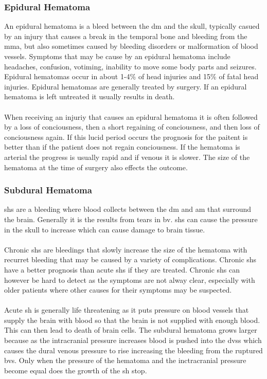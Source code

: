 \documentclass[11pt]{article}
\begin{document}
\subsubsection{Epidural Hematoma}
An epidural hematoma is a bleed between the \gls{dm} and the skull, typically casued by an injury that causes a break in the temporal bone and bleeding from the \gls{mma}, but also sometimes caused by bleeding disorders or malformation of blood vessels. Symptoms that may be cause by an epidural hematoma include headaches, confusion, votiming, inability to move some body parts and seizures. Epidural hematomas occur in about 1-4\% of head injuries and 15\% of fatal head injuries. Epidural hematomas are generally treated by surgery. If an epidural hematoma is left untreated it usually results in death.\cite{EpiduralHematoma2021}\\
\\
When receiving an injuriy that causes an epidural hematoma it is often followed by a loss of conciousness, then a short regaining of conciousness, and then loss of conciousness again. If this lucid period occurs the prognosis for the paitent is better than if the patient does not regain conciousness. If the hematoma is arterial the progress is usually rapid and if venous it is slower. The size of the hematoma at the time of surgery also effects the outcome.\cite{EpiduralHematoma2021}

\subsubsection{Subdural Hematoma}
\glspl{sh} are a bleeding where blood collects between the \gls{dm} and \gls{am} that surround the brain. Generally it is the results from tears in \gls{bv}. \gls{sh}s can cause the pressure in the skull to increase which can cause damage to brain tissue.\cite{SubduralHematoma2021}\\
\\
Chronic \glspl{sh} are bleedings that slowly increase the size of the hematoma with recurret bleeding that may be caused by a variety of complications\cite{yadavChronicSubduralHematoma2016}. Chronic \glspl{sh} have a better prognosis than acute \glspl{sh} if they are treated. Chronic \glspl{sh} can however be hard to detect as the symptoms are not alway clear, especially with older patients where other causes for their symptoms may be suspected\cite{yadavChronicSubduralHematoma2016}.\cite{SubduralHematoma2021}\\
\\
Acute \gls{sh} is generally life threatening as it puts pressure on blood vessels that supply the brain with blood so that the brain is not supplied with enough blood. This can then lead to death of brain cells. The subdural hematoma grows larger because as the intracranial pressure increases blood is pushed into the \glspl{dvs} which causes the dural venous pressure to rise increasing the bleeding from the ruptured \glspl{bv}. Only when the pressure of the hematoma and the inctracranial pressure become equal does the growth of the \gls{sh} stop.\cite{SubduralHematoma2021}
\end{document}
